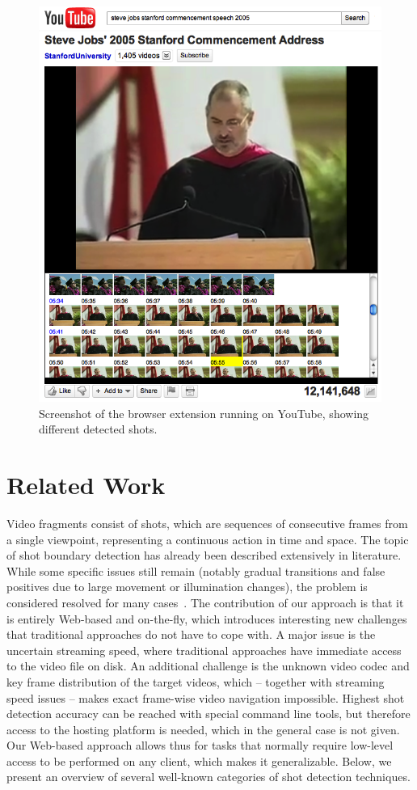 \documentclass{acm_proc_article-sp}
\begin{document}
\begin{figure}
\begin{center}
   \includegraphics[width=0.85\linewidth]{./resources/stevejobs.png}
\end{center}
   \caption{Screenshot of the browser extension running on YouTube, showing different detected shots.}
\label{fig:screenshot}
\end{figure}

\section{Related Work} \label{sec:related-work}
Video fragments consist of shots, which are sequences of consecutive frames from a single viewpoint, representing a continuous action in time and space. The topic of shot boundary detection has already been described extensively in literature. While some specific issues still remain (notably gradual transitions and false positives due to large movement or illumination changes), the problem is considered resolved for many cases~\cite{Hanjalic2002, Yuan2007}. The contribution of our approach is that it is entirely Web-based and on-the-fly, which introduces interesting new challenges that traditional approaches do not have to cope with. A major issue is the uncertain streaming speed, where traditional approaches have immediate access to the video file on disk. An additional challenge is the unknown video codec and key frame distribution of the target videos, which -- together with streaming speed issues -- makes exact frame-wise video navigation impossible. Highest shot detection accuracy can be reached with special command line tools, but therefore access to the hosting platform is needed, which in the general case is not given. Our Web-based approach allows thus for tasks that normally require low-level access to be performed on any client, which makes it generalizable. Below, we present an overview of several well-known categories of shot detection techniques.
\end{document}
